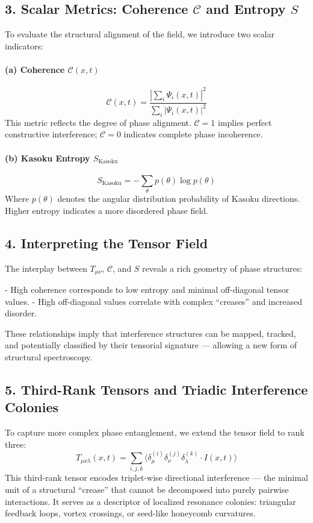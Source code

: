 \subsection*{3. Scalar Metrics: Coherence \( \mathcal{C} \) and Entropy \( S \)}
To evaluate the structural alignment of the field, we introduce two scalar indicators:

\paragraph{(a) Coherence \( \mathcal{C}(x,t) \)}
\[
\mathcal{C}(x,t) = \frac{|\sum_i \Psi_i(x,t)|^2}{\sum_i |\Psi_i(x,t)|^2}
\]
This metric reflects the degree of phase alignment. \( \mathcal{C} = 1 \) implies perfect constructive interference; \( \mathcal{C} = 0 \) indicates complete phase incoherence.

\paragraph{(b) Kasoku Entropy \( S_{\text{Kasoku}} \)}
\[
S_{\text{Kasoku}} = -\sum_{\theta} p(\theta) \log p(\theta)
\]
Where \( p(\theta) \) denotes the angular distribution probability of Kasoku directions. Higher entropy indicates a more disordered phase field.

\subsection*{4. Interpreting the Tensor Field}
The interplay between \( T_{\mu\nu} \), \( \mathcal{C} \), and \( S \) reveals a rich geometry of phase structures:

- High coherence corresponds to low entropy and minimal off-diagonal tensor values.
- High off-diagonal values correlate with complex “creases” and increased disorder.

These relationships imply that interference structures can be mapped, tracked, and potentially classified by their tensorial signature — allowing a new form of structural spectroscopy.

\subsection*{5. Third-Rank Tensors and Triadic Interference Colonies}
To capture more complex phase entanglement, we extend the tensor field to rank three:
\[
T_{\mu\nu\lambda}(x,t) = \sum_{i,j,k} \langle \delta_\mu^{(i)} \delta_\nu^{(j)} \delta_\lambda^{(k)} \cdot I(x,t) \rangle
\]
This third-rank tensor encodes triplet-wise directional interference — the minimal unit of a structural “crease” that cannot be decomposed into purely pairwise interactions. It serves as a descriptor of localized resonance colonies: triangular feedback loops, vortex crossings, or seed-like honeycomb curvatures.

